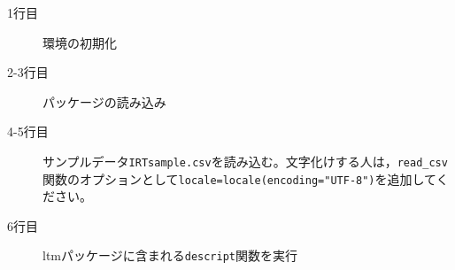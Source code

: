\begin{description}
	\item[1行目] 環境の初期化
	\item[2-3行目] パッケージの読み込み
	\item[4-5行目] サンプルデータ\texttt{IRTsample.csv}を読み込む。文字化けする人は，\verb|read_csv|関数のオプションとして\texttt{locale=locale(encoding="UTF-8")}を追加してください。
	\item[6行目] ltmパッケージに含まれる\texttt{descript}関数を実行
\end{description}
